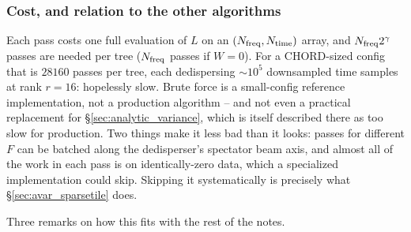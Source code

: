\documentclass{article}
\numberwithin{equation}{section}   %
\begin{document}
\subsubsection{Cost, and relation to the other algorithms}

Each pass costs one full evaluation of $L$ on an $(N_{\rm freq}, N_{\rm time})$ array, and
$N_{\rm freq} 2^\gamma$ passes are needed per tree ($N_{\rm freq}$ passes if $W=0$). For a
CHORD-sized config that is $28160$ passes per tree, each dedispersing $\sim\!10^5$ downsampled time
samples at rank $r=16$: hopelessly slow. Brute force is a small-config reference implementation,
not a production algorithm -- and not even a practical replacement for
\S\ref{sec:analytic_variance}, which is itself described there as too slow for production. Two
things make it less bad than it looks: passes for different $F$ can be batched along the
dedisperser's spectator beam axis, and almost all of the work in each pass is on identically-zero
data, which a specialized implementation could skip. Skipping it systematically is precisely what
\S\ref{sec:avar_sparsetile} does.

Three remarks on how this fits with the rest of the notes.
\end{document}
